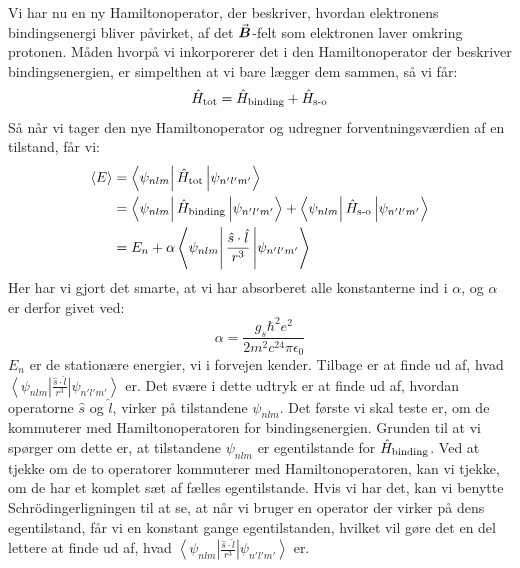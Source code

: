 \documentclass[../../Atom-ogMolekylefysik.tex]{subfiles}
\begin{document}
Vi har nu en ny Hamiltonoperator, der beskriver, hvordan elektronens bindingsenergi bliver påvirket, af det ${\vec{\boldsymbol{B}}}$-felt som elektronen laver omkring protonen. Måden hvorpå vi inkorporerer det i den Hamiltonoperator der beskriver bindingsenergien, er simpelthen at vi bare lægger dem sammen, så vi får:
\begin{equation}
    \hat H_\text{tot}=\hat H_\text{binding}+\hat H_\text{s-o}
\end{equation}
Så når vi tager den nye Hamiltonoperator og udregner forventningsværdien af en tilstand, får vi:
\begin{align}
    \expect{E}&=\matrixel{\psi_{nlm}}{\op H_\text{tot}}{\psi_{n'l'm'}}\nonumber\\
    &=\matrixel{\psi_{nlm}}{\op H_\text{binding}}{\psi_{n'l'm'}}+\matrixel{\psi_{nlm}}{\op H_\text{s-o}}{\psi_{n'l'm'}}\\
    &=E_{n}+\alpha\matrixel{\psi_{nlm}}{\frac{\op{s}\cdot\op{l}}{r^3}}{\psi_{n'l'm'}}\nonumber
\end{align}
Her har vi gjort det smarte, at vi har absorberet alle konstanterne ind i $\alpha$, og $\alpha$ er derfor givet ved:
\begin{equation}
\alpha=\frac{g_s\hbar^2e^2}{2m^2c^24\pi\epsilon_0}
\end{equation}
$E_n$ er de stationære energier, vi i forvejen kender. Tilbage er at finde ud af, hvad $\left<\psi_{nlm}\right|\frac{\hat{s}\cdot\hat{l}}{r^3}\left|\psi_{n'l'm'}\right>$ er. Det svære i dette udtryk er at finde ud af, hvordan operatorne $\hat{s}$ og $\hat{l}$, virker på tilstandene $\psi_{nlm}$. Det første vi skal teste er, om de kommuterer med Hamiltonoperatoren for bindingsenergien. Grunden til at vi spørger om dette er, at tilstandene $\psi_{nlm}$ er egentilstande for $\hat H_\text{binding}$. Ved at tjekke om de to operatorer kommuterer med Hamiltonoperatoren, kan vi tjekke, om de har et komplet sæt af fælles egentilstande. Hvis vi har det, kan vi benytte Schrödingerligningen til at se, at når vi bruger en operator der virker på dens egentilstand, får vi en konstant gange egentilstanden, hvilket vil gøre det en del lettere at finde ud af, hvad $\left<\psi_{nlm}\right|\frac{\hat{s}\cdot\hat{l}}{r^3}\left|\psi_{n'l'm'}\right>$ er.
\end{document}
